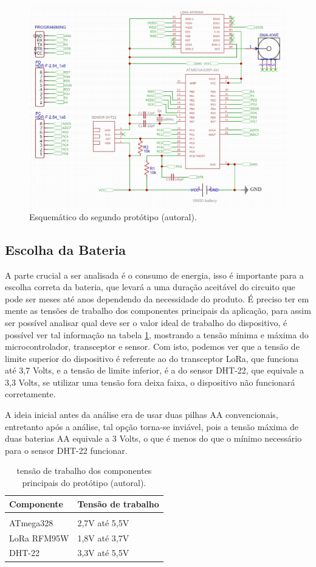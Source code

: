 \begin{figure}[H]
  \centering
  \includegraphics[width=.80\textwidth]{assets/end-node-proto-2-schematic.png} 
  \caption{Esquemático do segundo protótipo (autoral).}
  \label{fig:end-node-proto-2-schematic} 
\end{figure}

\subsection{Escolha da Bateria}
\label{metod:end-node:bateria}
A parte crucial a ser analisada é o consumo de energia, isso é importante para a escolha correta da bateria, que levará a uma duração aceitável do circuito que pode ser meses até anos dependendo da necessidade do produto. É preciso ter em mente as tensões de trabalho dos componentes principais da aplicação, para assim ser possível analisar qual deve ser o valor ideal de trabalho do dispositivo, é possível ver tal informação na tabela \ref{tab:end-node-componentes-volts}, mostrando a tensão mínima e máxima do microcontrolador, transceptor e sensor. Com isto, podemos ver que a tensão de limite superior do dispositivo é referente ao do transceptor LoRa, que funciona até 3,7 Volts, e a tensão de limite inferior, é a do sensor DHT-22, que equivale a 3,3 Volts, se utilizar uma tensão fora deixa faixa, o dispositivo não funcionará corretamente. 

A ideia inicial antes da análise era de usar duas pilhas AA convencionais, entretanto após a análise, tal opção torna-se inviável, pois a tensão máxima de duas baterias AA equivale a 3 Volts, o que é menos do que o mínimo necessário para o sensor DHT-22 funcionar.

\begin{table}[H]
\centering 
\scalebox{1} {
	\begin{tabular}{l | l}
	\textbf{Componente}&\textbf{Tensão de trabalho}\\[5pt] \hline
  \\
	ATmega328&2,7V até 5,5V\\[5pt]
	LoRa RFM95W&1,8V até 3,7V\\[5pt]
	DHT-22&3,3V até 5,5V\\[5pt]
	\end{tabular}
}
\caption{tensão de trabalho dos componentes principais do protótipo (autoral).}
\label{tab:end-node-componentes-volts}
\end{table}

